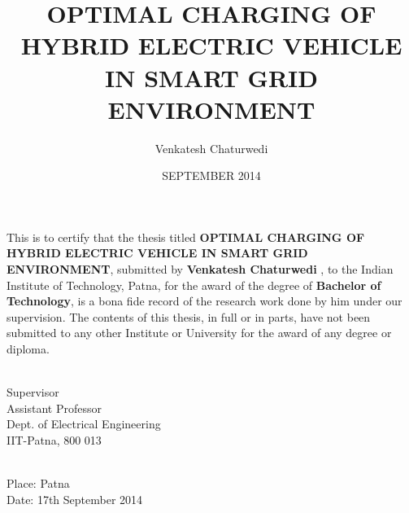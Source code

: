 \documentclass[BTech]{iitpdiss}
\begin{document}

\title{OPTIMAL CHARGING OF HYBRID ELECTRIC VEHICLE IN SMART GRID ENVIRONMENT}

\author{Venkatesh Chaturwedi}
\date{SEPTEMBER 2014}

\maketitle

\certificate

\vspace*{0.5in}

\noindent This is to certify that the thesis titled {\bf OPTIMAL CHARGING OF HYBRID ELECTRIC VEHICLE IN SMART GRID ENVIRONMENT}, submitted by {\bf Venkatesh Chaturwedi },
to the Indian Institute of Technology, Patna, for
the award of the degree of {\bf Bachelor of Technology}, is a bona fide
record of the research work done by him under our supervision.  The
contents of this thesis, in full or in parts, have not been submitted
to any other Institute or University for the award of any degree or
diploma.

\vspace*{1.5in}

\begin{singlespacing}
	\hspace*{-0.25in}
	\hfill
	\parbox{2.5in}{
		 \\
		\noindent Supervisor \\
		\noindent Assistant Professor \\
		\noindent Dept.  of  Electrical Engineering\\
		\noindent IIT-Patna, 800 013 \\
	}
\end{singlespacing}
\vspace*{0.25in}
\\
\noindent Place: Patna\\
\noindent Date: 17th September 2014
\end{document}
